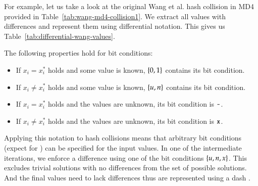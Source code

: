 For example, let us take a look at the original Wang et al. hash collision
in MD4 provided in Table~\ref{tab:wang-md4-collision1}.
We extract all values with differences and represent them using differential notation.
This gives us Table~\ref{tab:differential-wang-values}.

The following properties hold for bit conditions:
\begin{itemize}[noitemsep,topsep=0pt]
  \item If $x_i = x_i^*$ holds and some value is known, $\left\{0,1\right\}$ contains its bit condition.
  \item If $x_i \neq x_i^*$ holds and some value is known, $\left\{u,n\right\}$ contains its bit condition.
  \item If $x_i = x_i^*$ holds and the values are unknown, its bit condition is $\texttt{-}$.
  \item If $x_i \neq x_i^*$ holds and the values are unknown, its bit condition is $\texttt{x}$.
\end{itemize}
Applying this notation to hash collisions means that arbitrary bit conditions
(expect for \dnI{\#}) can be specified for the input values. In one of the
intermediate iterations, we enforce a difference using one of the bit conditions
$\left\{u,n,x\right\}$. This excludes trivial solutions with no differences from the set of
possible solutions. And the final values need to lack differences thus are
represented using a dash \dnI{-}.

